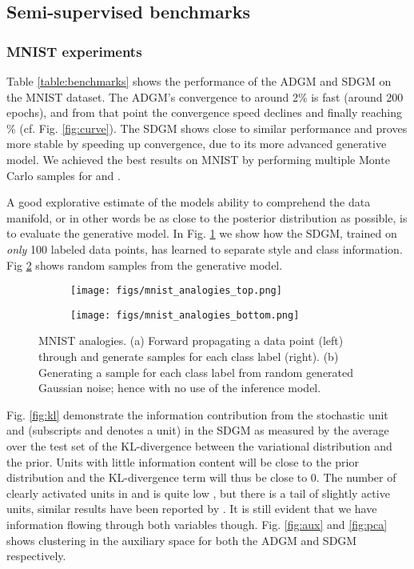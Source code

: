 \documentclass{article}
\begin{document}
\subsection{Semi-supervised benchmarks}\label{sec:benchmarks}


\subsubsection*{MNIST experiments}
Table \ref{table:benchmarks} shows the performance of the ADGM and SDGM on the MNIST dataset. The ADGM's convergence to around 2\% is fast (around 200 epochs), and from that point the convergence speed declines and finally reaching \% (cf. Fig. \ref{fig:curve}). The SDGM shows close to similar performance and proves more stable by speeding up convergence, due to its more advanced generative model. We achieved the best results on MNIST by performing multiple Monte Carlo samples for  and .

A good explorative estimate of the models ability to comprehend the data manifold, or in other words be as close to the posterior distribution as possible, is to evaluate the generative model. In Fig. \ref{fig:mnist_top} we show how the SDGM, trained on \emph{only} 100 labeled data points, has learned to separate style and class information. Fig \ref{fig:mnist_bottom} shows random samples from the generative model.
\begin{figure}[h!]
  \centering
  \begin{subfigure}{.40\textwidth}
  \centering
  \texttt{[image: figs/mnist\_analogies\_top.png]}
  \caption{ }
  \label{fig:mnist_top}
  \end{subfigure}
  \begin{subfigure}{.40\textwidth}
  \centering
  \texttt{[image: figs/mnist\_analogies\_bottom.png]}
  \caption{ }
  \label{fig:mnist_bottom}
  \end{subfigure}
   \vspace{-2mm}
  \caption{MNIST analogies. (a) Forward propagating a data point  (left) through  and generate samples  for each class label  (right). (b) Generating a sample for each class label from random generated Gaussian noise; hence with no use of the inference model.}
  \label{fig:mnist}
  \vspace{-4mm}
\end{figure}

Fig. \ref{fig:kl} demonstrate the information contribution from the stochastic unit  and  (subscripts  and  denotes a unit) in the SDGM as measured by the average over the test set of the KL-divergence between the variational distribution and the prior. Units with little information content will be close to the prior distribution and the KL-divergence term will thus be close to 0. The number of clearly activated units in  and  is quite low , but there is a tail of slightly active units, similar results have been reported by \citet{Burda15}. It is still evident that we have information flowing through both variables though. Fig. \ref{fig:aux} and \ref{fig:pca} shows clustering in the auxiliary space for both the ADGM and SDGM respectively.
\end{document}
